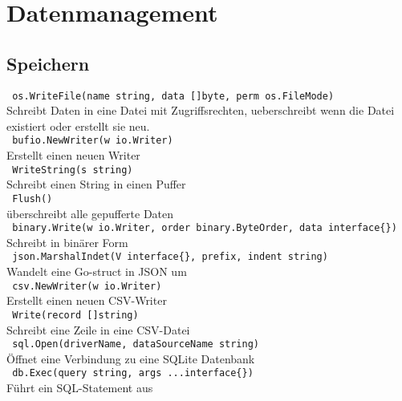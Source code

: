 \documentclass[twoside,a4paper,12pt]{article}
\begin{document}
\section{Datenmanagement}
\subsection{Speichern}
\verb| os.WriteFile(name string, data []byte, perm os.FileMode) | \\ 
Schreibt Daten in eine Datei mit Zugriffsrechten, ueberschreibt wenn die Datei \\ 
existiert oder erstellt sie neu. \\ 
\verb| bufio.NewWriter(w io.Writer) | \\ 
Erstellt einen neuen Writer \\ 
\verb| WriteString(s string) | \\ 
Schreibt einen String in einen Puffer \\ 
\verb| Flush() | \\ 
überschreibt alle gepufferte Daten \\ 
\verb| binary.Write(w io.Writer, order binary.ByteOrder, data interface{}) | \\ 
Schreibt in binärer Form \\ 
\verb| json.MarshalIndet(V interface{}, prefix, indent string) | \\ 
Wandelt eine Go-struct in JSON um \\ 
\verb| csv.NewWriter(w io.Writer) | \\ 
Erstellt einen neuen CSV-Writer \\ 
\verb| Write(record []string) | \\ 
Schreibt eine Zeile in eine CSV-Datei \\ 
\verb| sql.Open(driverName, dataSourceName string) | \\ 
Öffnet eine Verbindung zu eine SQLite Datenbank \\ 
\verb| db.Exec(query string, args ...interface{}) | \\ 
Führt ein SQL-Statement aus \\ 
\end{document}

